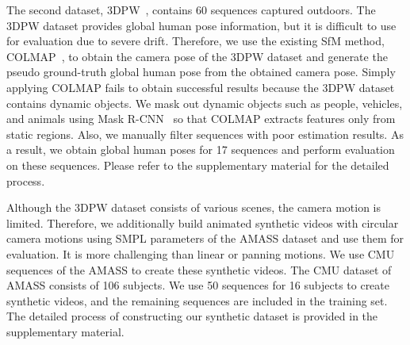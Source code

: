 \documentclass[10pt,twocolumn,letterpaper]{article}
\begin{document}
The second dataset, 3DPW~\cite{von2018recovering}, contains 60 sequences captured outdoors. The 3DPW dataset provides global human pose information, but it is difficult to use for evaluation due to severe drift. Therefore, we use the existing SfM method, COLMAP~\cite{schonberger2016structure}, to obtain the camera pose of the 3DPW dataset and generate the pseudo ground-truth global human pose from the obtained camera pose. Simply applying COLMAP fails to obtain successful results because the 3DPW dataset contains dynamic objects. We mask out dynamic objects such as people, vehicles, and animals using Mask R-CNN~\cite{he2017mask} so that COLMAP extracts features only from static regions. Also, we manually filter sequences with poor estimation results. As a result, we obtain global human poses for 17 sequences and perform evaluation on these sequences. Please refer to the supplementary material for the detailed process.

Although the 3DPW dataset consists of various scenes, the camera motion is limited. Therefore, we additionally build animated synthetic videos with circular camera motions using SMPL parameters of the AMASS dataset and use them for evaluation. It is more challenging than linear or panning motions. We use CMU sequences of the AMASS to create these synthetic videos. The CMU dataset of AMASS consists of 106 subjects. We use 50 sequences for 16 subjects to create synthetic videos, and the remaining sequences are included in the training set. The detailed process of constructing our synthetic dataset is provided in the supplementary material.


\end{document}
